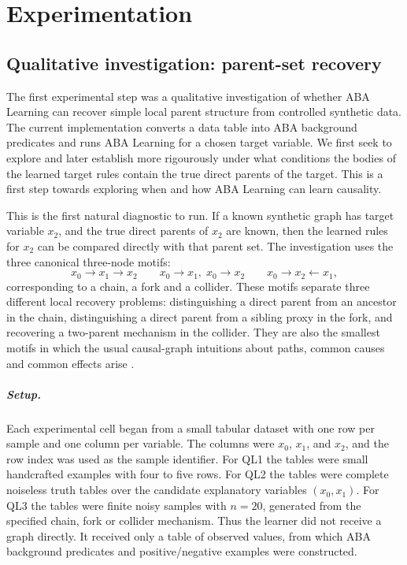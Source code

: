 \chapter{Experimentation}

\section{Qualitative investigation: parent-set recovery}
\label{subsec:qualitative-parent-recovery}

The first experimental step was a qualitative investigation of whether ABA Learning can recover simple local parent structure from controlled synthetic data. The current implementation converts a data table into ABA background predicates and runs ABA Learning for a chosen target variable. We first seek to explore and later establish more rigourously under what conditions the bodies of the learned target rules contain the true direct parents of the target. This is a first step towards exploring when and how ABA Learning can learn causality.

This is the first natural diagnostic to run. If a known synthetic graph has target variable \(x_2\), and the true direct parents of \(x_2\) are known, then the learned rules for \(x_2\) can be compared directly with that parent set. The investigation uses the three canonical three-node motifs:
\[
x_0 \rightarrow x_1 \rightarrow x_2
\qquad
x_0 \rightarrow x_1,\; x_0 \rightarrow x_2
\qquad
x_0 \rightarrow x_2 \leftarrow x_1,
\]
corresponding to a chain, a fork and a collider. These motifs separate three different local recovery problems: distinguishing a direct parent from an ancestor in the chain, distinguishing a direct parent from a sibling proxy in the fork, and recovering a two-parent mechanism in the collider. They are also the smallest motifs in which the usual causal-graph intuitions about paths, common causes and common effects arise \cite{glymour2019review,vowels2022d}.

\paragraph{Setup.}

Each experimental cell began from a small tabular dataset with one row per sample and one column per variable. The columns were \(x_0\), \(x_1\), and \(x_2\), and the row index was used as the sample identifier. For QL1 the tables were small handcrafted examples with four to five rows. For QL2 the tables were complete noiseless truth tables over the candidate explanatory variables \((x_0,x_1)\). For QL3 the tables were finite noisy samples with \(n=20\), generated from the specified chain, fork or collider mechanism. Thus the learner did not receive a graph directly. It received only a table of observed values, from which ABA background predicates and positive/negative examples were constructed.


